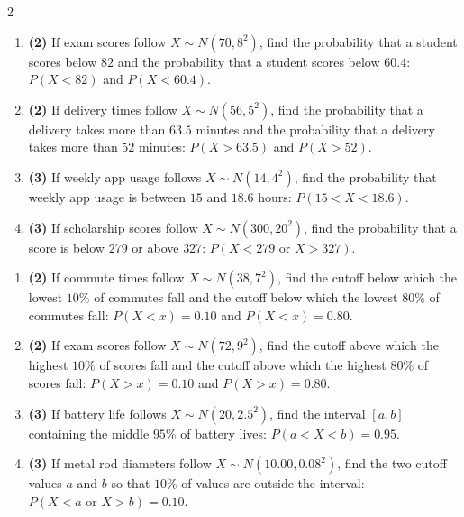 \begin{multicols}{2}
		\vspace{0.25cm}
		\vspace{-0.3cm}

		\begin{enumerate}[label=\textbf{\alph*)}]
			\item \textbf{(2)} If exam scores follow \(X\sim N(70,8^2)\), find the probability that a student scores below \(82\) and the probability that a student scores below \(60.4\): \(P(X<82)\) and \(P(X<60.4)\).
			
			\item \textbf{(2)} If delivery times follow \(X\sim N(56,5^2)\), find the probability that a delivery takes more than \(63.5\) minutes and the probability that a delivery takes more than \(52\) minutes: \(P(X>63.5)\) and \(P(X>52)\).
			
			\item \textbf{(3)} If weekly app usage follows \(X\sim N(14,4^2)\), find the probability that weekly app usage is between \(15\) and \(18.6\) hours: \(P(15<X<18.6)\).
			
			\item \textbf{(3)} If scholarship scores follow \(X\sim N(300,20^2)\), find the probability that a score is below \(279\) or above \(327\): \(P(X<279\text{ or }X>327)\).
		\end{enumerate}
		
		\vspace{0.25cm}
		\vspace{-0.3cm}
		
		\begin{enumerate}[label=\textbf{\alph*)}]
			\item \textbf{(2)} If commute times follow \(X\sim N(38,7^2)\), find the cutoff below which the lowest \(10\%\) of commutes fall and the cutoff below which the lowest \(80\%\) of commutes fall: \(P(X<x)=0.10\) and \(P(X<x)=0.80\).
			
			\item \textbf{(2)} If exam scores follow \(X\sim N(72,9^2)\), find the cutoff above which the highest \(10\%\) of scores fall and the cutoff above which the highest \(80\%\) of scores fall: \(P(X>x)=0.10\) and \(P(X>x)=0.80\).
			
			\item \textbf{(3)} If battery life follows \(X\sim N(20,2.5^2)\), find the interval \([a,b]\) containing the middle \(95\%\) of battery lives: \(P(a<X<b)=0.95\).
			
			\item \textbf{(3)} If metal rod diameters follow \(X\sim N(10.00,0.08^2)\), find the two cutoff values \(a\) and \(b\) so that \(10\%\) of values are outside the interval: \(P(X<a\text{ or }X>b)=0.10\).
		\end{enumerate}
		
	\end{multicols}
	
